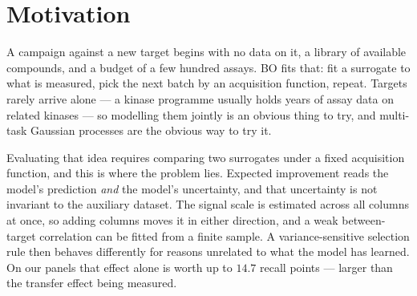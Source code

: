 \documentclass[11pt]{article}
\begin{document}
\begin{abstract}
\paragraph{What is actually worth doing.} Interpreted against the matched null-auxiliary control,
sharing data between targets is worth $+7$ to $+14$ points on these two
panels, when the old data was already paid for and was measured on the same
compounds. The gains were largest and most consistent around $22$--$33\%$
library coverage. In one campaign-matching calculation, roughly five historical
measurements on related targets were needed to replace one measurement on the
target of interest, so the result is most attractive when that data already
exists. By
contrast, simply changing \emph{which number the model predicts} --- a
selectivity score instead of raw potency --- is worth $+39.7$ points at the same
cost on the same data, with no sharing at all. The choice of what to optimise produced one of the largest effects we measured.

We also list eight things we expected to be true that were not, and two data
problems in widely used public benchmarks. Everything here is measured by
replaying published data; no compound was made or tested for this work.
\end{abstract}

\section{Motivation}

A campaign against a new target begins with no data on it, a library of
available compounds, and a budget of a few hundred assays. BO fits that: fit a
surrogate to what is measured, pick the next batch by an acquisition function,
repeat. Targets rarely arrive alone --- a kinase programme usually holds years
of assay data on related kinases --- so modelling them jointly is an obvious
thing to try, and multi-task Gaussian processes are the obvious way to try it.

Evaluating that idea requires comparing two surrogates under a fixed
acquisition function, and this is where the problem lies. Expected improvement
reads the model's prediction \emph{and} the model's uncertainty, and that
uncertainty is not invariant to the auxiliary dataset. The signal scale is
estimated across all columns at once, so adding columns moves it in either
direction, and a weak between-target correlation can be fitted from a finite
sample. A variance-sensitive selection rule then behaves differently for
reasons unrelated to what the model has learned. On our
panels that effect alone is worth up to $14.7$ recall points --- larger than the
transfer effect being measured.
\end{document}

